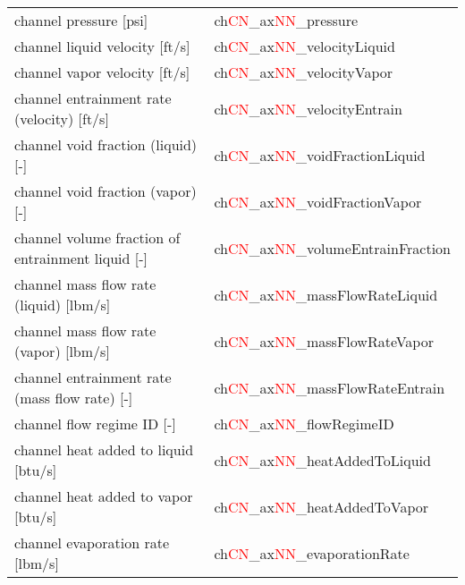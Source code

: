 \begin{itemize}
\begin{table}[h]
\begin{tabular}{|l|l|}
     channel pressure [psi] & ch\textcolor{red}{CN}\_ax\textcolor{red}{NN}\_pressure \\
     channel liquid velocity [ft/s] & ch\textcolor{red}{CN}\_ax\textcolor{red}{NN}\_velocityLiquid \\
     channel vapor velocity [ft/s] & ch\textcolor{red}{CN}\_ax\textcolor{red}{NN}\_velocityVapor \\ 
     channel entrainment rate (velocity) [ft/s] & ch\textcolor{red}{CN}\_ax\textcolor{red}{NN}\_velocityEntrain \\  
     channel void fraction (liquid) [-] & ch\textcolor{red}{CN}\_ax\textcolor{red}{NN}\_voidFractionLiquid \\ 
     channel void fraction (vapor) [-] & ch\textcolor{red}{CN}\_ax\textcolor{red}{NN}\_voidFractionVapor \\
     channel volume fraction of entrainment liquid [-] & ch\textcolor{red}{CN}\_ax\textcolor{red}{NN}\_volumeEntrainFraction \\  
     channel mass flow rate (liquid) [lbm/s] & ch\textcolor{red}{CN}\_ax\textcolor{red}{NN}\_massFlowRateLiquid \\ 
     channel mass flow rate (vapor) [lbm/s] & ch\textcolor{red}{CN}\_ax\textcolor{red}{NN}\_massFlowRateVapor \\ 
     channel entrainment rate (mass flow rate) [-] & ch\textcolor{red}{CN}\_ax\textcolor{red}{NN}\_massFlowRateEntrain \\  
     channel flow regime ID [-] & ch\textcolor{red}{CN}\_ax\textcolor{red}{NN}\_flowRegimeID \\  
     channel heat added to liquid [btu/s] & ch\textcolor{red}{CN}\_ax\textcolor{red}{NN}\_heatAddedToLiquid \\ 
     channel heat added to vapor [btu/s] & ch\textcolor{red}{CN}\_ax\textcolor{red}{NN}\_heatAddedToVapor \\ 
     channel evaporation rate [lbm/s] & ch\textcolor{red}{CN}\_ax\textcolor{red}{NN}\_evaporationRate \\ 


\end{tabular}
\end{table}
\end{itemize}
